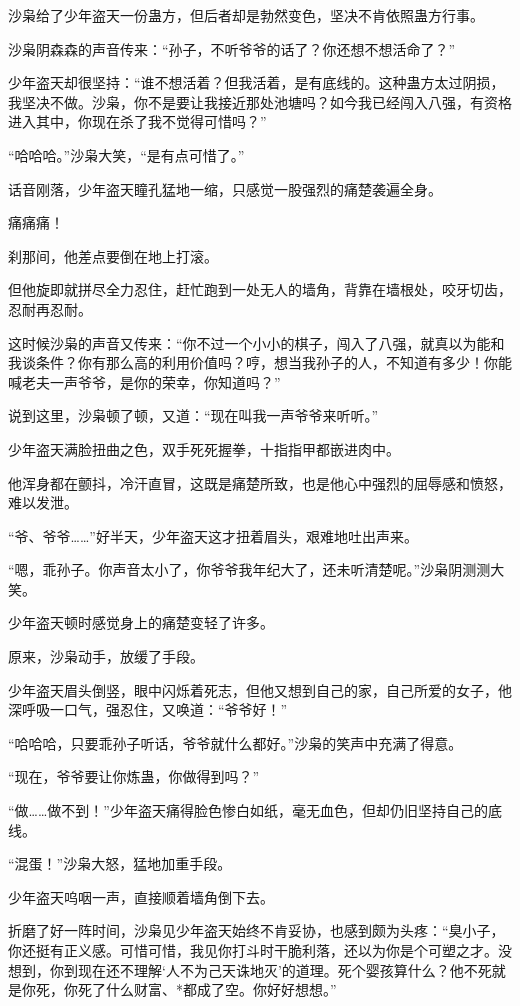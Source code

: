 
\begin{this_body}

沙枭给了少年盗天一份蛊方，但后者却是勃然变色，坚决不肯依照蛊方行事。

沙枭阴森森的声音传来：“孙子，不听爷爷的话了？你还想不想活命了？”

少年盗天却很坚持：“谁不想活着？但我活着，是有底线的。这种蛊方太过阴损，我坚决不做。沙枭，你不是要让我接近那处池塘吗？如今我已经闯入八强，有资格进入其中，你现在杀了我不觉得可惜吗？”

“哈哈哈。”沙枭大笑，“是有点可惜了。”

话音刚落，少年盗天瞳孔猛地一缩，只感觉一股强烈的痛楚袭遍全身。

痛痛痛！

刹那间，他差点要倒在地上打滚。

但他旋即就拼尽全力忍住，赶忙跑到一处无人的墙角，背靠在墙根处，咬牙切齿，忍耐再忍耐。

这时候沙枭的声音又传来：“你不过一个小小的棋子，闯入了八强，就真以为能和我谈条件？你有那么高的利用价值吗？哼，想当我孙子的人，不知道有多少！你能喊老夫一声爷爷，是你的荣幸，你知道吗？”

说到这里，沙枭顿了顿，又道：“现在叫我一声爷爷来听听。”

少年盗天满脸扭曲之色，双手死死握拳，十指指甲都嵌进肉中。

他浑身都在颤抖，冷汗直冒，这既是痛楚所致，也是他心中强烈的屈辱感和愤怒，难以发泄。

“爷、爷爷……”好半天，少年盗天这才扭着眉头，艰难地吐出声来。

“嗯，乖孙子。你声音太小了，你爷爷我年纪大了，还未听清楚呢。”沙枭阴测测大笑。

少年盗天顿时感觉身上的痛楚变轻了许多。

原来，沙枭动手，放缓了手段。

少年盗天眉头倒竖，眼中闪烁着死志，但他又想到自己的家，自己所爱的女子，他深呼吸一口气，强忍住，又唤道：“爷爷好！”

“哈哈哈，只要乖孙子听话，爷爷就什么都好。”沙枭的笑声中充满了得意。

“现在，爷爷要让你炼蛊，你做得到吗？”

“做……做不到！”少年盗天痛得脸色惨白如纸，毫无血色，但却仍旧坚持自己的底线。

“混蛋！”沙枭大怒，猛地加重手段。

少年盗天呜咽一声，直接顺着墙角倒下去。

折磨了好一阵时间，沙枭见少年盗天始终不肯妥协，也感到颇为头疼：“臭小子，你还挺有正义感。可惜可惜，我见你打斗时干脆利落，还以为你是个可塑之才。没想到，你到现在还不理解‘人不为己天诛地灭’的道理。死个婴孩算什么？他不死就是你死，你死了什么财富、*都成了空。你好好想想。”


\end{this_body}
